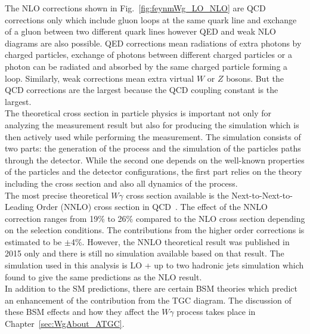 The NLO corrections shown in Fig.~\ref{fig:feynmWg_LO_NLO} are QCD corrections only which include gluon loops at the same quark line and exchange of a gluon between two different quark lines however QED and weak NLO diagrams are also possible. QED corrections mean radiations of extra photons by charged particles, exchange of photons between different charged particles or a photon can be radiated and absorbed by the same charged particle forming a loop. Similarly, weak corrections mean extra virtual $W$ or $Z$ bosons. But the QCD corrections are the largest because the QCD coupling constant is the largest.\\

The theoretical cross section in particle physics is important not only for analyzing the measurement result but also for producing the simulation which is then actively used while performing the measurement. The simulation consists of two parts: the generation of the process and the simulation of the particles paths through the detector. While the second one depends on the well-known properties of the particles and the detector configurations, the first part relies on the theory including the cross section and also all dynamics of the process.\\

The most precise theoretical $W\gamma$ cross section available is the Next-to-Next-to-Leading Order (NNLO) cross section in QCD~\cite{ref_theory_NNLO}. The effect of the NNLO correction ranges from 19\% to 26\% compared to the NLO cross section depending on the selection conditions. The contributions from the higher order corrections is estimated to be $\pm$4\%. However, the NNLO theoretical result was published in 2015 only and there is still no simulation available based on that result. The simulation used in this analysis is LO + up to two hadronic jets simulation which found to give the same predictions as the NLO result.\\

In addition to the SM predictions, there are certain BSM theories which predict an enhancement of the contribution from the TGC diagram. The discussion of these BSM effects and how they affect the $W\gamma$ process takes place in Chapter~\ref{sec:WgAbout_ATGC}.\\ 


